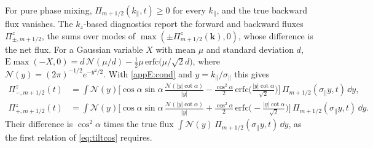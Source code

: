 For pure phase mixing, $\Pi_{m+1/2}(k_\parallel,t)\ge0$ for every $k_\parallel$, and the true backward flux vanishes. The $k_z$-based diagnostics report the forward and backward fluxes $\Pi^z_{\pm,m+1/2}$, the sums over modes of $\max(\pm\Pi^z_{m+1/2}(\boldsymbol k),0)$, whose difference is the net flux. For a Gaussian variable $X$ with mean $\mu$ and standard deviation $d$, $\mathrm E\max(-X,0)=d\,\mathcal N(\mu/d)-\tfrac12\mu\,\mathrm{erfc}\big(\mu/\sqrt2d\big)$, where $\mathcal N(y)=(2\pi)^{-1/2}e^{-y^2/2}$. With \eqref{appE:cond} and $y=k_\parallel/\sigma_\parallel$ this gives
\begin{equation}\label{appE:FB}
\begin{aligned}
  \Pi^z_{-,m+1/2}(t)&=\int\mathcal N(y)\Big[\cos\alpha\sin\alpha\,\frac{\mathcal N(|y|\cot\alpha)}{|y|}-\frac{\cos^2\alpha}{2}\,\mathrm{erfc}\Big(\frac{|y|\cot\alpha}{\sqrt2}\Big)\Big]\,\Pi_{m+1/2}(\sigma_\parallel y,t)\,\dd y,\\
  \Pi^z_{+,m+1/2}(t)&=\int\mathcal N(y)\Big[\cos\alpha\sin\alpha\,\frac{\mathcal N(|y|\cot\alpha)}{|y|}+\frac{\cos^2\alpha}{2}\,\mathrm{erfc}\Big(-\frac{|y|\cot\alpha}{\sqrt2}\Big)\Big]\,\Pi_{m+1/2}(\sigma_\parallel y,t)\,\dd y .
\end{aligned}
\end{equation}
Their difference is $\cos^2\alpha$ times the true flux $\int\mathcal N(y)\,\Pi_{m+1/2}(\sigma_\parallel y,t)\,\dd y$, as the first relation of \eqref{eq:tiltcos} requires.


